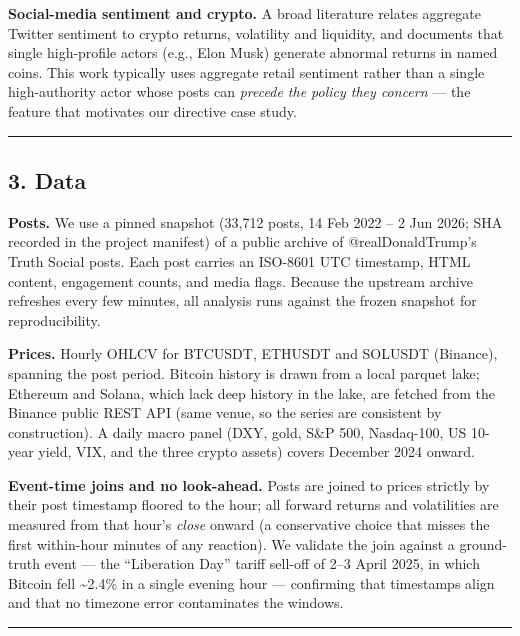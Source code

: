 \documentclass[
]{article}
\begin{document}
\textbf{Social-media sentiment and crypto.} A broad literature relates
aggregate Twitter sentiment to crypto returns, volatility and liquidity,
and documents that single high-profile actors (e.g., Elon Musk) generate
abnormal returns in named coins. This work typically uses aggregate
retail sentiment rather than a single high-authority actor whose posts
can \emph{precede the policy they concern} --- the feature that
motivates our directive case study.

\begin{center}\rule{0.5\linewidth}{0.5pt}\end{center}

\subsection{3. Data}\label{data}

\textbf{Posts.} We use a pinned snapshot (33,712 posts, 14 Feb 2022 -- 2
Jun 2026; SHA recorded in the project manifest) of a public archive of
@realDonaldTrump's Truth Social posts. Each post carries an ISO-8601 UTC
timestamp, HTML content, engagement counts, and media flags. Because the
upstream archive refreshes every few minutes, all analysis runs against
the frozen snapshot for reproducibility.

\textbf{Prices.} Hourly OHLCV for BTCUSDT, ETHUSDT and SOLUSDT
(Binance), spanning the post period. Bitcoin history is drawn from a
local parquet lake; Ethereum and Solana, which lack deep history in the
lake, are fetched from the Binance public REST API (same venue, so the
series are consistent by construction). A daily macro panel (DXY, gold,
S\&P 500, Nasdaq-100, US 10-year yield, VIX, and the three crypto
assets) covers December 2024 onward.

\textbf{Event-time joins and no look-ahead.} Posts are joined to prices
strictly by their post timestamp floored to the hour; all forward
returns and volatilities are measured from that hour's \emph{close}
onward (a conservative choice that misses the first within-hour minutes
of any reaction). We validate the join against a ground-truth event ---
the ``Liberation Day'' tariff sell-off of 2--3 April 2025, in which
Bitcoin fell \textasciitilde2.4\% in a single evening hour ---
confirming that timestamps align and that no timezone error contaminates
the windows.

\begin{center}\rule{0.5\linewidth}{0.5pt}\end{center}
\end{document}
